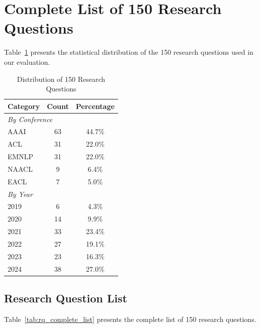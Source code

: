 \section{Complete List of 150 Research Questions}
\label{app:rq_list}

Table~\ref{tab:rq_statistics} presents the statistical distribution of the 150 research questions used in our evaluation.

\begin{table}[h]
\centering
\small
\caption{Distribution of 150 Research Questions}
\label{tab:rq_statistics}
\begin{tabular}{lcc}
\toprule
\textbf{Category} & \textbf{Count} & \textbf{Percentage} \\
\midrule
\multicolumn{3}{l}{\textit{By Conference}} \\
AAAI & 63 & 44.7\% \\
ACL & 31 & 22.0\% \\
EMNLP & 31 & 22.0\% \\
NAACL & 9 & 6.4\% \\
EACL & 7 & 5.0\% \\
\midrule
\multicolumn{3}{l}{\textit{By Year}} \\
2019 & 6 & 4.3\% \\
2020 & 14 & 9.9\% \\
2021 & 33 & 23.4\% \\
2022 & 27 & 19.1\% \\
2023 & 23 & 16.3\% \\
2024 & 38 & 27.0\% \\
\bottomrule
\end{tabular}
\end{table}

\subsection{Research Question List}

Table~\ref{tab:rq_complete_list} presents the complete list of 150 research questions.

